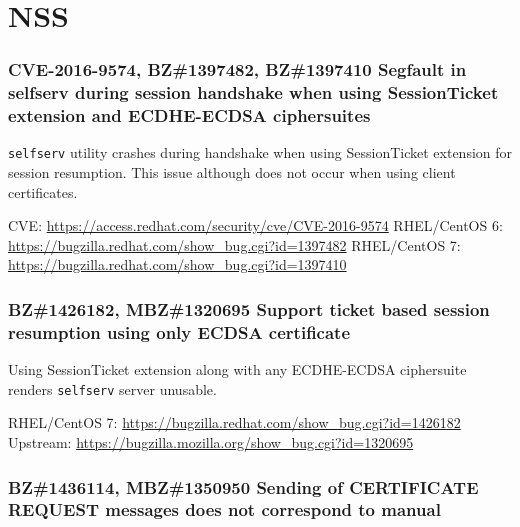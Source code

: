 \section{NSS}
\subsubsection*{{\color{red} CVE-2016-9574}, BZ\#1397482, BZ\#1397410  \newline
    Segfault in selfserv during session handshake when using SessionTicket
    extension and ECDHE-ECDSA ciphersuites}

    \texttt{selfserv} utility crashes during handshake when using SessionTicket
    extension for session resumption. This issue although does not occur when
    using client certificates.

    \medskip\noindent CVE: \url{https://access.redhat.com/security/cve/CVE-2016-9574}
    \newline\noindent RHEL/CentOS 6: \url{https://bugzilla.redhat.com/show_bug.cgi?id=1397482}
    \newline\noindent RHEL/CentOS 7: \url{https://bugzilla.redhat.com/show_bug.cgi?id=1397410}

\subsubsection*{BZ\#1426182, MBZ\#1320695  \newline
    Support ticket based session resumption using only ECDSA certificate}

    Using SessionTicket extension along with any ECDHE-ECDSA ciphersuite
    renders \texttt{selfserv} server unusable.

    \medskip\noindent RHEL/CentOS 7: \url{https://bugzilla.redhat.com/show_bug.cgi?id=1426182}
    \newline\noindent Upstream: \url{https://bugzilla.mozilla.org/show_bug.cgi?id=1320695}

\subsubsection*{BZ\#1436114, MBZ\#1350950  \newline
    Sending of CERTIFICATE REQUEST messages does not correspond to manual}

